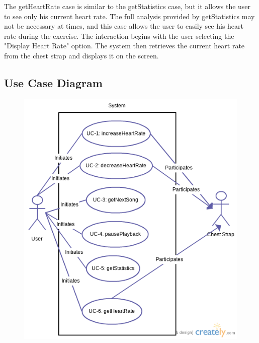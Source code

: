 \documentclass[letterpaper,english, 12pt]{scrreprt}
\begin{document}
The getHeartRate case is similar to the getStatistics case, but it allows the user to see only his current heart rate. The full analysis provided by getStatistics may not be necessary at times, and this case allows the user to easily see his heart rate during the exercise. The interaction begins with the user selecting the "Display Heart Rate" option. The system then retrieves the current heart rate from the chest strap and displays it on the screen.

\subsection{Use Case Diagram}
\begin{figure}[H]
	\centering
	\includegraphics{img/use_case.png}\\
\end{figure}
\end{document}
